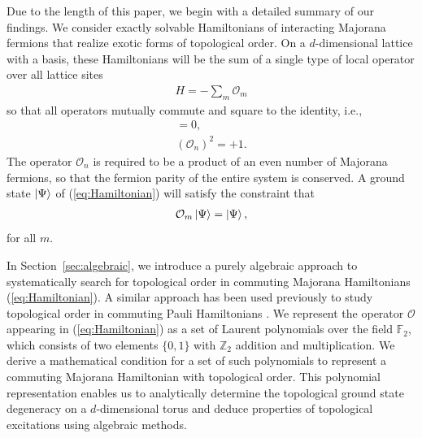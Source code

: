 \documentclass[aps,twocolumn,preprintnumbers,floatfix,showpacs,prx]{revtex4-1}
\begin{document}
Due to the length of this paper, we begin with a detailed summary of our findings.
We consider exactly solvable Hamiltonians of interacting Majorana fermions that realize exotic forms of topological order.
On a $d$-dimensional lattice with a basis, these Hamiltonians will be the sum of a single type of local operator over all lattice sites
\begin{align}\label{eq:Hamiltonian}
H = -\sum_{m}\mathcal{O}_{m}
\end{align}
so that all operators mutually commute and square to the identity, i.e., 
\begin{align}
[\mathcal{O}_{m},\mathcal{O}_{n}] = 0 , \\ (\mathcal{O}_{n})^{2} = +1.
\end{align}
The operator $\mathcal{O}_{n}$ is required to be a product of an even number of Majorana fermions,
so that the fermion parity of the entire system is conserved.
A ground state $\ket{\Psi}$ of (\ref{eq:Hamiltonian}) will satisfy the constraint that 
\begin{align}
\mathcal{O}_{m}\ket{\Psi} = \ket{\Psi}, \label{gs}
\end{align}
for all $m$.

In Section~\ref{sec:algebraic},
we introduce a purely algebraic approach to systematically search for topological order in commuting Majorana Hamiltonians (\ref{eq:Hamiltonian}).  
A similar approach has been used previously to study topological order in commuting Pauli Hamiltonians \cite{Haah_Commuting_Pauli}.
We represent the operator $\mathcal{O}$ appearing in (\ref{eq:Hamiltonian})
as a set of Laurent polynomials over the field $\mathbb{F}_{2}$,
which consists of two elements $\{0, 1\}$ with $\mathbb{Z}_{2}$ addition and multiplication.
We derive a mathematical condition for a set of such polynomials to represent a commuting Majorana Hamiltonian with topological order.
This polynomial representation enables us to  analytically determine the topological ground state degeneracy on a $d$-dimensional torus %
and deduce properties of topological excitations using algebraic methods.
\end{document}
